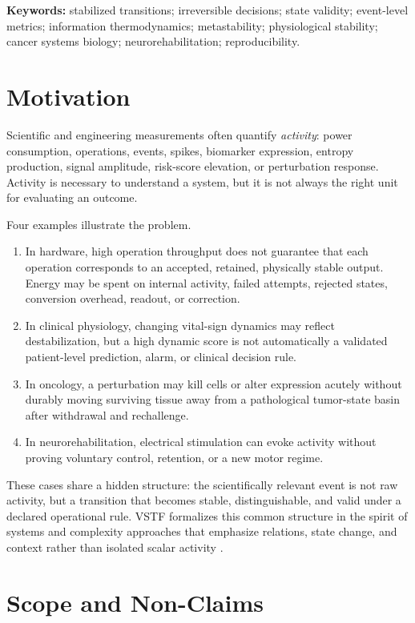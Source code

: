\documentclass[11pt,a4paper]{article}
\newcommand{\1}{\mathbf{1}}
\begin{document}
\noindent\textbf{Keywords:} stabilized transitions; irreversible decisions; state validity; event-level metrics; information thermodynamics; metastability; physiological stability; cancer systems biology; neurorehabilitation; reproducibility.

\section{Motivation}

Scientific and engineering measurements often quantify \emph{activity}: power consumption, operations, events, spikes, biomarker expression, entropy production, signal amplitude, risk-score elevation, or perturbation response. Activity is necessary to understand a system, but it is not always the right unit for evaluating an outcome.

Four examples illustrate the problem.

\begin{enumerate}
  \item In hardware, high operation throughput does not guarantee that each operation corresponds to an accepted, retained, physically stable output. Energy may be spent on internal activity, failed attempts, rejected states, conversion overhead, readout, or correction.
  \item In clinical physiology, changing vital-sign dynamics may reflect destabilization, but a high dynamic score is not automatically a validated patient-level prediction, alarm, or clinical decision rule.
  \item In oncology, a perturbation may kill cells or alter expression acutely without durably moving surviving tissue away from a pathological tumor-state basin after withdrawal and rechallenge.
  \item In neurorehabilitation, electrical stimulation can evoke activity without proving voluntary control, retention, or a new motor regime.
\end{enumerate}

These cases share a hidden structure: the scientifically relevant event is not raw activity, but a transition that becomes stable, distinguishable, and valid under a declared operational rule. VSTF formalizes this common structure in the spirit of systems and complexity approaches that emphasize relations, state change, and context rather than isolated scalar activity \cite{sturmberg2014}.

\section{Scope and Non-Claims}
\end{document}
